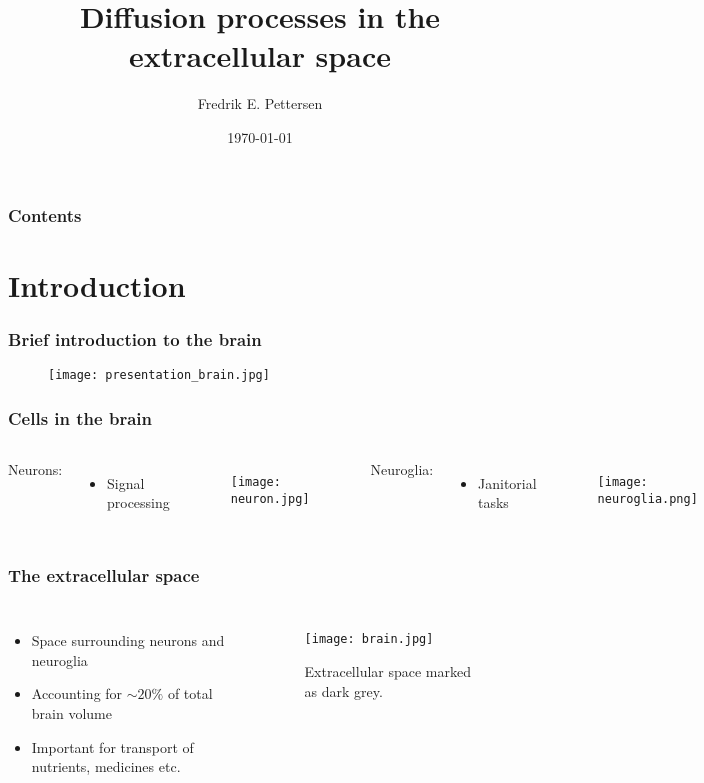 \documentclass{beamer}
\title[Presentation - Computational neuroscience]{Diffusion processes in the extracellular space}
\author{Fredrik E. Pettersen}
\date{\today}
\begin{document}
\begin{frame}
\titlepage
\end{frame}



\begin{frame}
 \frametitle{Contents}
 \tableofcontents[hideallsubsections]
\end{frame}

\section{Introduction}
\begin{frame}
 \frametitle{Brief introduction to the brain}
 \begin{figure}
  \centering
  \texttt{[image: presentation\_brain.jpg]}
 \end{figure}
\end{frame}

\begin{frame}
 \frametitle{Cells in the brain}
 \begin{columns}
\column{2.0in} Neurons:\\
\begin{itemize}
 \item Signal processing
\end{itemize}
\begin{figure}[H]
 \centering
 \texttt{[image: neuron.jpg]}
\end{figure}

\column{2.0in} Neuroglia:\\
\begin{itemize}
 \item Janitorial tasks
\end{itemize}
\begin{figure}[H]
 \centering
 \texttt{[image: neuroglia.png]}
\end{figure}
 \end{columns}
\end{frame}

\begin{frame}
 \frametitle{The extracellular space}
 \begin{columns}
 \column{2.0in}
 \begin{itemize}
  \item Space surrounding neurons and neuroglia
  \item Accounting for $\sim20\%$ of total brain volume
  \item Important for transport of nutrients, medicines etc.
 \end{itemize}

\column{2.0in}
 \begin{figure}[H]
  \texttt{[image: brain.jpg]}
  \caption{Extracellular space marked as dark grey.}
 \end{figure}
 \end{columns}

\end{frame}
\end{document}
